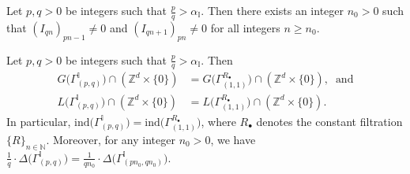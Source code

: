 \documentclass[10pt,a4paper]{amsart}
\begin{document}
\begin{lemma}\label{lem_converge}
Let $p,q>0$ be integers such that $\tfrac{p}{q}>\alpha_{\mathbb{I}}$. Then there exists an integer $n_0>0$ such that ${\left(I_{qn}\right)}_{pn-1}\neq 0$ and ${\left(I_{qn+1}\right)}_{pn}\neq 0$ for all integers $n\geq n_0$.
\end{lemma}

\begin{proposition}\label{welldefined}
Let $p,q>0$ be integers such that $\tfrac{p}{q}>\alpha_{\mathbb{I}}$. Then
\begin{align*}
G\big(\Gamma^{\mathbb{I}}_{(p,q)}\big) \cap \left(\mathbb{Z}^d\times \{0\}\right) &= G\big(\Gamma^{R_{\bullet}}_{(1,1)}\big) \cap \left(\mathbb{Z}^d\times \{0\}\right),\;\;\text{and}\\
L\big(\Gamma^{\mathbb{I}}_{(p,q)}\big) \cap \left(\mathbb{Z}^d\times \{0\}\right) &= L\big(\Gamma^{R_{\bullet}}_{(1,1)}\big) \cap \left(\mathbb{Z}^d\times \{0\}\right).
\end{align*}
In particular, $\mathrm{ind}\big(\Gamma^{\mathbb{I}}_{(p,q)}\big)= \mathrm{ind}\big(\Gamma^{{R}_{\bullet}}_{(1,1)}\big)$, where ${R}_{\bullet}$ denotes the constant filtration $\{R\}_{n\in\mathbb{N}}$. Moreover, for any integer $n_0>0$, we have $\frac{1}{q}\cdot\Delta\big(\Gamma^{\mathbb{I}}_{(p,q)}\big) = \frac{1}{qn_0}\cdot\Delta\big(\Gamma^{\mathbb{I}}_{(pn_0,qn_0)}\big)$.
\end{proposition}
\end{document}
